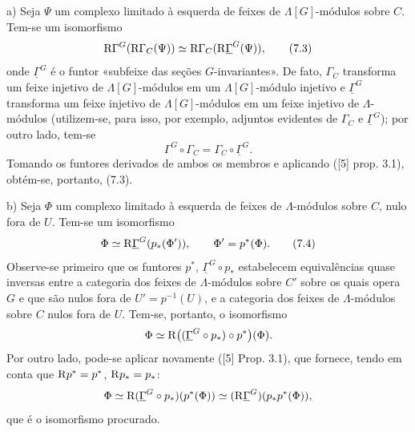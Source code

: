 a) Seja $\Psi$ um complexo limitado à esquerda de feixes de $\Lambda[G]$-módulos sobre $C$. Tem-se um isomorfismo
\[
\mathrm{R}\Gamma^G(\mathrm{R}\Gamma_C(\Psi))\simeq\mathrm{R}\Gamma_C(\mathrm{R}\underline{\Gamma}^G(\Psi)),
\tag{7.3}
\]
onde $\underline{\Gamma}^G$ é o funtor «subfeixe das seções $G$-invariantes». De fato, $\Gamma_C$ transforma um feixe injetivo de $\Lambda[G]$-módulos em um $\Lambda[G]$-módulo injetivo e $\underline{\Gamma}^G$ transforma um feixe injetivo de $\Lambda[G]$-módulos em um feixe injetivo de $\Lambda$-módulos (utilizem-se, para isso, por exemplo, adjuntos evidentes de $\Gamma_C$ e $\underline{\Gamma}^G$); por outro lado, tem-se
\[
\Gamma^G\circ\Gamma_C=\Gamma_C\circ\underline{\Gamma}^G.
\]
Tomando os funtores derivados de ambos os membros e aplicando ([5] prop. 3.1), obtém-se, portanto, (7.3).

b) Seja $\Phi$ um complexo limitado à esquerda de feixes de $\Lambda$-módulos sobre $C$, nulo fora de $U$. Tem-se um isomorfismo
\[
\Phi\simeq \mathrm{R}\underline{\Gamma}^G(p_*(\Phi')),
\qquad \Phi'=p^*(\Phi).
\tag{7.4}
\]
Observe-se primeiro que os funtores $p^*$, $\underline{\Gamma}^G\circ p_*$ estabelecem equivalências quase inversas entre a categoria dos feixes de $\Lambda$-módulos sobre $C'$ sobre os quais opera $G$ e que são nulos fora de $U'=p^{-1}(U)$, e a categoria dos feixes de $\Lambda$-módulos sobre $C$ nulos fora de $U$. Tem-se, portanto, o isomorfismo
\[
\Phi\simeq \mathrm{R}\bigl((\underline{\Gamma}^G\circ p_*)\circ p^*\bigr)(\Phi).
\]
Por outro lado, pode-se aplicar novamente ([5] Prop. 3.1), que fornece, tendo em conta que $\mathrm{R} p^*=p^*$, $\mathrm{R} p_*=p_*$:
\[
\Phi\simeq \mathrm{R}(\underline{\Gamma}^G\circ p_*)(p^*(\Phi))
\simeq (\mathrm{R}\underline{\Gamma}^G)(p_*p^*(\Phi)),
\]
que é o isomorfismo procurado.

